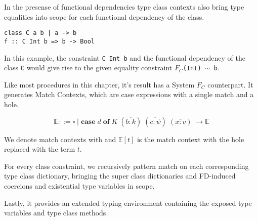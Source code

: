 In the presense of functional dependencies type class contexts also bring type
equalities into scope for each functional dependency of the class.
\begin{verbatim}
class C a b | a -> b
f :: C Int b => b -> Bool
\end{verbatim}
In this example, the constraint \texttt{C Int b} and the functional dependency
of the class \texttt{C} would give rise to the given equality constraint
\texttt{$F_C$(Int) $\sim$ b}.

Like most procedures in this chapter, it's result has a System $F_C$
counterpart. It generates Match Contexts, which are case expressions with a
single match and a hole.
\begin{figure}[h]
$$
\mathbb{E} ::= \square \mid \textbf{case} \; d \; \textbf{of} \; K \;
(\overline{b : k}) \; (\overline{c : \psi}) \; (\overline{x : v}) \; \rightarrow
\mathbb{E}
$$
\end{figure}
We denote match contexts with  and $\mathbb{E}[t]$ is the match
context with the hole replaced with the term $t$.

For every class constraint, we recursively pattern match on each corresponding
type class dictionary, bringing the super class dictionaries and FD-induced
coercions and existential type variables in scope.

Lastly, it provides an extended typing environment containing the exposed type
variables and type class methods.


